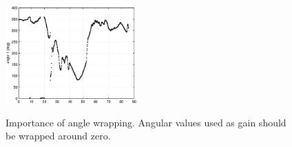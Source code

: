 \begin{figure}[h]
\vspace{-10pt}
\begin{center}
\includegraphics[width=0.45\textwidth]{methodology/fig/angle1.eps}
\caption{Importance of angle wrapping. Angular values used as gain should be wrapped around zero.}
\vspace{-10pt}
\label{fig:ang-wrapping}
\end{center}
\end{figure} 